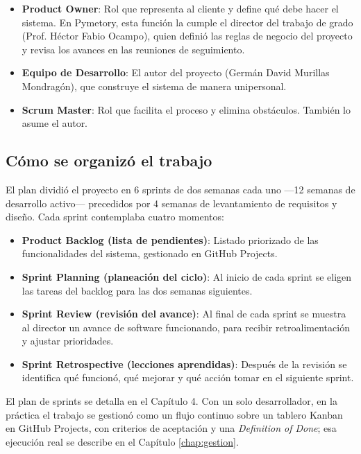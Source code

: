 \begin{itemize}
    \item \textbf{Product Owner}: Rol que representa al cliente y define qué debe hacer el sistema. En Pymetory, esta función la cumple el director del trabajo de grado (Prof. Héctor Fabio Ocampo), quien definió las reglas de negocio del proyecto y revisa los avances en las reuniones de seguimiento.
    \item \textbf{Equipo de Desarrollo}: El autor del proyecto (Germán David Murillas Mondragón), que construye el sistema de manera unipersonal.
    \item \textbf{Scrum Master}: Rol que facilita el proceso y elimina obstáculos. También lo asume el autor.
\end{itemize}

\subsection{Cómo se organizó el trabajo}

El plan dividió el proyecto en 6 sprints de dos semanas cada uno —12 semanas de desarrollo activo— precedidos por 4 semanas de levantamiento de requisitos y diseño. Cada sprint contemplaba cuatro momentos:

\begin{itemize}
    \item \textbf{Product Backlog (lista de pendientes)}: Listado priorizado de las funcionalidades del sistema, gestionado en GitHub Projects.
    \item \textbf{Sprint Planning (planeación del ciclo)}: Al inicio de cada sprint se eligen las tareas del backlog para las dos semanas siguientes.
    \item \textbf{Sprint Review (revisión del avance)}: Al final de cada sprint se muestra al director un avance de software funcionando, para recibir retroalimentación y ajustar prioridades.
    \item \textbf{Sprint Retrospective (lecciones aprendidas)}: Después de la revisión se identifica qué funcionó, qué mejorar y qué acción tomar en el siguiente sprint.
\end{itemize}

El plan de sprints se detalla en el Capítulo 4. Con un solo desarrollador, en la práctica el trabajo se gestionó como un flujo continuo sobre un tablero Kanban en GitHub Projects, con criterios de aceptación y una \textit{Definition of Done}; esa ejecución real se describe en el Capítulo \ref{chap:gestion}.

\newpage
